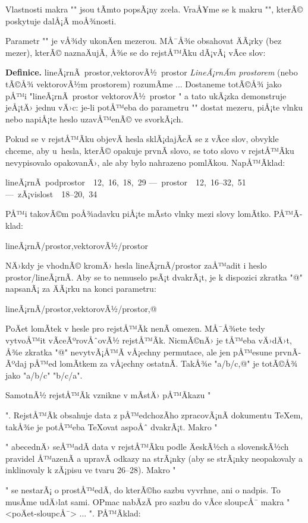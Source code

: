 Vlastnosti makra "\iid" jsou tÃ­mto popsÃ¡ny zcela. VraÅ¥me se k makru "\ii",
kterÃ© poskytuje dalÅ¡Ã­ moÅ¾nosti.

Parametr "\ii" je vÅ¾dy ukonÄen mezerou. MÅ¯Å¾e obsahovat ÄÃ¡rky (bez mezer),
kterÃ© naznaÄujÃ­, Å¾e se do rejstÅ™Ã­ku dÃ¡vÃ¡ vÃ­ce slov:

\begtt
{\bf Definice.}
\ii lineÃ¡rnÃ­~prostor,vektorovÃ½~prostor
{\em LineÃ¡rnÃ­m prostorem} (nebo tÃ©Å¾ vektorovÃ½m prostorem) rozumÃ­me ...
\endtt
%
Dostaneme totÃ©Å¾ jako pÅ™i "\ii lineÃ¡rnÃ­~prostor \ii vektorovÃ½~prostor "
a tato ukÃ¡zka demonstruje jeÅ¡tÄ› jednu vÄ›c: je-li potÅ™eba do parametru "\ii"
dostat mezeru, piÅ¡te vlnku nebo napiÅ¡te heslo uzavÅ™enÃ© ve svorkÃ¡ch.

Pokud se v rejstÅ™Ã­ku objevÃ­ hesla sklÃ¡dajÃ­cÃ­ se z vÃ­ce slov, obvykle chceme,
aby u~hesla, kterÃ© opakuje prvnÃ­ slovo, se toto slovo 
v rejstÅ™Ã­ku nevypisovalo opakovanÄ›, ale
aby bylo nahrazeno pomlÄkou. NapÅ™Ã­klad:
\par\nobreak
\medskip
\hbox{\indent lineÃ¡rnÃ­ podprostor \ 12, 16, 18, 29}\nobreak
\hbox{\indent \space --- prostor \ 12, 16--32, 51}\nobreak
\hbox{\indent \space --- zÃ¡vislost \ 18--20, 34}
\medskip

\noindent PÅ™i takovÃ©m poÅ¾adavku piÅ¡te mÃ­sto vlnky mezi slovy lomÃ­tko. PÅ™Ã­klad:

\begtt
\ii lineÃ¡rnÃ­/prostor,vektorovÃ½/prostor
\endtt

NÄ›kdy je vhodnÃ© kromÄ› hesla lineÃ¡rnÃ­/prostor zaÅ™adit i heslo
prostor/lineÃ¡rnÃ­. Aby se to nemuselo psÃ¡t dvakrÃ¡t, je k dispozici zkratka
"@" napsanÃ¡ za ÄÃ¡rku na konci parametru:

\begtt
\ii lineÃ¡rnÃ­/prostor,vektorovÃ½/prostor,@
\endtt

PoÄet lomÃ­tek v hesle pro rejstÅ™Ã­k nenÃ­ omezen. MÅ¯Å¾ete tedy vytvoÅ™it
vÃ­ceÃºrovÅˆovÃ½ rejstÅ™Ã­k. NicmÃ©nÄ› je tÅ™eba vÄ›dÄ›t, Å¾e zkratka "@" nevytvÃ¡Å™Ã­
vÅ¡echny permutace, ale jen pÅ™esune prvnÃ­ Ãºdaj pÅ™ed lomÃ­tkem za vÅ¡echny
ostatnÃ­. TakÅ¾e "\ii a/b/c,@" je totÃ©Å¾ jako "\ii a/b/c" "\ii b/c/a".

SamotnÃ½ rejstÅ™Ã­k vznikne v mÃ­stÄ› pÅ™Ã­kazu "\makeindex". RejstÅ™Ã­k obsahuje
data z pÅ™edchozÃ­ho zpracovÃ¡nÃ­ dokumentu \TeX{}em, takÅ¾e je potÅ™eba
\TeX{}ovat aspoÅˆ dvakrÃ¡t. Makro "\makeindex" abecednÄ› seÅ™adÃ­ data v rejstÅ™Ã­ku
podle ÄeskÃ½ch a slovenskÃ½ch pravidel Å™azenÃ­ a upravÃ­ odkazy na strÃ¡nky
(aby se strÃ¡nky neopakovaly a inklinovaly k zÃ¡pisu ve tvaru 26--28). Makro
"\makeindex" se nestarÃ¡ o prostÅ™edÃ­, do kterÃ©ho sazbu vyvrhne, ani o nadpis.
To musÃ­me udÄ›lat sami. OPmac nabÃ­zÃ­ pro sazbu do vÃ­ce sloupcÅ¯ makra
"\begmulti <poÄet-sloupcÅ¯> ... \endmulti". PÅ™Ã­klad:

